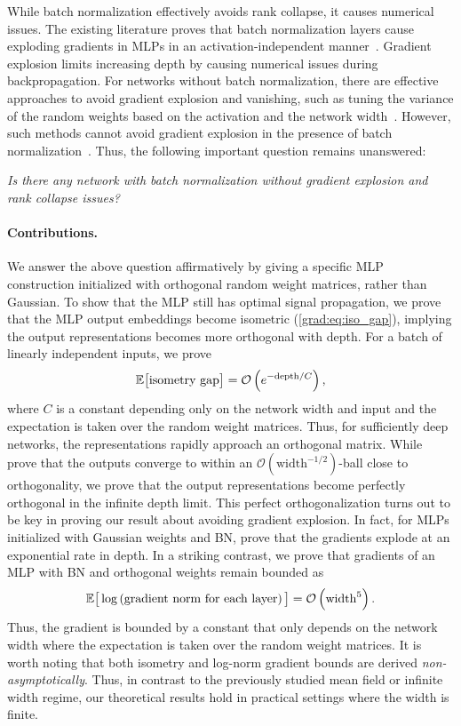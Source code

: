 While batch normalization effectively avoids rank collapse, it causes numerical issues. The existing literature proves that batch normalization layers cause exploding gradients in MLPs in an activation-independent manner~\cite{yang2018a}. Gradient explosion limits increasing depth by causing numerical issues during backpropagation. For networks without batch normalization, there are effective approaches to avoid gradient explosion and vanishing, such as tuning the variance of the random weights based on the activation and the network width~\citep{he2015delving,glorot2010understanding}. However, such methods cannot avoid gradient explosion in the presence of batch normalization~\cite{yang2018a}. Thus, the following important question remains unanswered:  
\begin{center} \emph{Is there any network with batch normalization without gradient explosion and rank collapse issues?}\end{center}

\paragraph{Contributions.}
We answer the above question affirmatively by giving a specific MLP construction initialized with orthogonal random weight matrices, rather than Gaussian. To show that the MLP still has optimal signal propagation, we prove that the MLP output embeddings become isometric (\eqref{grad:eq:iso_gap}), implying the output representations becomes more orthogonal with depth. For a batch of linearly independent inputs, we prove
\begin{align}\label{grad:eq:iso_gap_decay}
    \mathbb{E}\big[\text{isometry gap}\big] = \mathcal{O}\left( e^{-\text{depth}/C}\right),
\end{align}
where $C$ is a constant depending only on the network width and input and the expectation is taken over the random weight matrices. Thus, for sufficiently deep networks, the representations rapidly approach an orthogonal matrix. While \citet{daneshmand2021batch} prove that the outputs converge to within an $\mathcal{O}(\text{width}^{-1/2})$-ball close to orthogonality, we prove that the output representations become perfectly orthogonal in the infinite depth limit. This perfect orthogonalization turns out to be key in proving our result about avoiding gradient explosion. In fact, for MLPs initialized with Gaussian weights and BN, \citet[Theorem 3.9]{yang2018a} prove that the gradients explode at an exponential rate in depth. In a striking contrast, we prove that gradients of an MLP with BN and orthogonal weights remain bounded as
\begin{align}\label{grad:eq:grad_norm_bounded}
    \mathbb{E} \big[
\log\left(\text{gradient norm for each layer}\right)\big] = \mathcal{O}\left( \text{width}^5\right).
\end{align}
Thus, the gradient is bounded by a constant that only depends on the network width where the expectation is taken over the random weight matrices. It is worth noting that both isometry and log-norm gradient bounds are derived \emph{non-asymptotically}. Thus, in contrast to the previously studied mean field or infinite width regime, our theoretical results hold in practical settings where the width is finite. 

